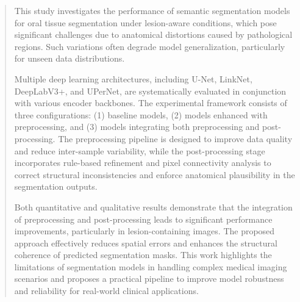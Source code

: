 \begin{abstract}
This study investigates the performance of semantic segmentation models for oral tissue segmentation under lesion-aware conditions, which pose significant challenges due to anatomical distortions caused by pathological regions. Such variations often degrade model generalization, particularly for unseen data distributions.

Multiple deep learning architectures, including U-Net, LinkNet, DeepLabV3+, and UPerNet, are systematically evaluated in conjunction with various encoder backbones. The experimental framework consists of three configurations: (1) baseline models, (2) models enhanced with preprocessing, and (3) models integrating both preprocessing and post-processing.
The preprocessing pipeline is designed to improve data quality and reduce inter-sample variability, while the post-processing stage incorporates rule-based refinement and pixel connectivity analysis to correct structural inconsistencies and enforce anatomical plausibility in the segmentation outputs.

Both quantitative and qualitative results demonstrate that the integration of preprocessing and post-processing leads to significant performance improvements, particularly in lesion-containing images. The proposed approach effectively reduces spatial errors and enhances the structural coherence of predicted segmentation masks.
This work highlights the limitations of segmentation models in handling complex medical imaging scenarios and proposes a practical pipeline to improve model robustness and reliability for real-world clinical applications.
\end{abstract}

%

